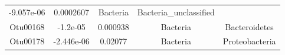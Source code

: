\documentclass[]{article}
\begin{document}
\begin{longtable}[]{@{}ccccc@{}}
\begin{minipage}[t]{0.16\columnwidth}
-9.057e-06\strut
\end{minipage} & \begin{minipage}[t]{0.14\columnwidth}\centering\strut
0.0002607\strut
\end{minipage} & \begin{minipage}[t]{0.13\columnwidth}\centering\strut
Bacteria\strut
\end{minipage} & \begin{minipage}[t]{0.27\columnwidth}\centering\strut
Bacteria\_unclassified\strut
\end{minipage}\tabularnewline
\begin{minipage}[t]{0.13\columnwidth}\centering\strut
Otu00168\strut
\end{minipage} & \begin{minipage}[t]{0.16\columnwidth}\centering\strut
-1.2e-05\strut
\end{minipage} & \begin{minipage}[t]{0.14\columnwidth}\centering\strut
0.000938\strut
\end{minipage} & \begin{minipage}[t]{0.13\columnwidth}\centering\strut
Bacteria\strut
\end{minipage} & \begin{minipage}[t]{0.27\columnwidth}\centering\strut
Bacteroidetes\strut
\end{minipage}\tabularnewline
\begin{minipage}[t]{0.13\columnwidth}\centering\strut
Otu00178\strut
\end{minipage} & \begin{minipage}[t]{0.16\columnwidth}\centering\strut
-2.446e-06\strut
\end{minipage} & \begin{minipage}[t]{0.14\columnwidth}\centering\strut
0.02077\strut
\end{minipage} & \begin{minipage}[t]{0.13\columnwidth}\centering\strut
Bacteria\strut
\end{minipage} & \begin{minipage}[t]{0.27\columnwidth}\centering\strut
Proteobacteria\strut
\end{minipage}\tabularnewline
\bottomrule
\end{longtable}
\end{document}
